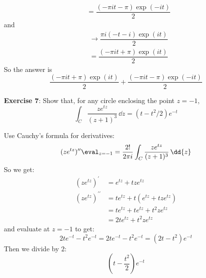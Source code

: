 \documentclass{article}
\begin{document}
\begin{answer}
\begin{align*}
                 &=           \dfrac{(-\pi i t - \pi)\exp(-it)}{2}       
            \end{align*}        
        and 
            \begin{align*}
                 &\rightarrow \dfrac{\pi i (- t - i)\exp(it)}{2}  \\
                 &=           \dfrac{(-\pi i t + \pi)\exp(it)}{2}   
            \end{align*}
        So the answer is
            \begin{equation*}
                \dfrac{(-\pi i t + \pi)\exp(it)}{2} + \dfrac{(-\pi i t - \pi)\exp(-it)}{2}
            \end{equation*}
    \end{answer}

\textbf{Exercise 7}: Show that, for any circle enclosing the point $z = -1$,
    \begin{equation*}
        \int_{C}^{} \dfrac{ze^{tz}}{(z + 1)^{3}} \, \dd{z}  = (t - t^{2}/2)e^{-t}
    \end{equation*}
        \begin{answer}
            Use Cauchy's formula for derivatives:
                \begin{equation*}
                    (ze^{tz})^{\prime\prime}\eval_{z = -1} = \dfrac{2!}{2\pi i}\int_{C}^{} \dfrac{ze^{tz}}{(z + 1)^{3}} \, \dd{z} 
                \end{equation*}
            So we get:
                \begin{align*}
                    (ze^{tz})^{\prime}       &= e^{tz} + tze^{tz}              \\
                    (ze^{tz})^{\prime\prime} &= te^{tz} + t(e^{tz} + tze^{tz}) \\
                                             &= te^{tz} + te^{tz} + t^{2}ze^{tz}   \\
                                             &= 2te^{tz} + t^{2}ze^{tz}              
                \end{align*}
            and evaluate at $z = -1$ to get:
                \begin{equation*}
                    2te^{-t} - t^{2}e^{-t} = 2te^{-t} - t^{2}e^{-t} = (2t - t^{2})e^{-t}
                \end{equation*}
            Then we divide by $2$:
                \begin{equation*}
                    (t - \frac{t^{2}}{2})e^{-t}
                \end{equation*}
        \end{answer}
\end{document}
